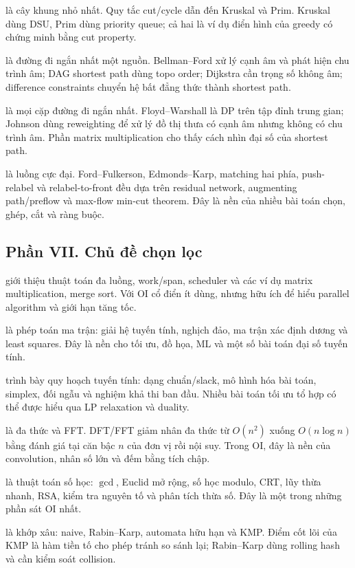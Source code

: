 \documentclass[11pt]{article}
\begin{document}
 là cây khung nhỏ nhất. Quy tắc cut/cycle dẫn đến Kruskal và
Prim. Kruskal dùng DSU, Prim dùng priority queue; cả hai là ví dụ điển hình của
greedy có chứng minh bằng cut property.

 là đường đi ngắn nhất một nguồn. Bellman--Ford xử lý cạnh âm
và phát hiện chu trình âm; DAG shortest path dùng topo order; Dijkstra cần trọng
số không âm; difference constraints chuyển hệ bất đẳng thức thành shortest path.

 là mọi cặp đường đi ngắn nhất. Floyd--Warshall là DP trên tập
đỉnh trung gian; Johnson dùng reweighting để xử lý đồ thị thưa có cạnh âm nhưng
không có chu trình âm. Phần matrix multiplication cho thấy cách nhìn đại số của
shortest path.

 là luồng cực đại. Ford--Fulkerson, Edmonds--Karp, matching
hai phía, push-relabel và relabel-to-front đều dựa trên residual network, augmenting
path/preflow và max-flow min-cut theorem. Đây là nền của nhiều bài toán chọn,
ghép, cắt và ràng buộc.

\subsection*{Phần VII. Chủ đề chọn lọc}

 giới thiệu thuật toán đa luồng, work/span, scheduler và các ví
dụ matrix multiplication, merge sort. Với OI cổ điển ít dùng, nhưng hữu ích để
hiểu parallel algorithm và giới hạn tăng tốc.

 là phép toán ma trận: giải hệ tuyến tính, nghịch đảo, ma trận
xác định dương và least squares. Đây là nền cho tối ưu, đồ họa, ML và một số
bài toán đại số tuyến tính.

 trình bày quy hoạch tuyến tính: dạng chuẩn/slack, mô hình hóa
bài toán, simplex, đối ngẫu và nghiệm khả thi ban đầu. Nhiều bài toán tối ưu tổ
hợp có thể được hiểu qua LP relaxation và duality.

 là đa thức và FFT. DFT/FFT giảm nhân đa thức từ \(O(n^2)\)
xuống \(O(n\log n)\) bằng đánh giá tại căn bậc \(n\) của đơn vị rồi nội suy.
Trong OI, đây là nền của convolution, nhân số lớn và đếm bằng tích chập.

 là thuật toán số học: \(\gcd\), Euclid mở rộng, số học modulo,
CRT, lũy thừa nhanh, RSA, kiểm tra nguyên tố và phân tích thừa số. Đây là một
trong những phần sát OI nhất.

 là khớp xâu: naive, Rabin--Karp, automata hữu hạn và KMP.
Điểm cốt lõi của KMP là hàm tiền tố cho phép tránh so sánh lại; Rabin--Karp
dùng rolling hash và cần kiểm soát collision.
\end{document}
